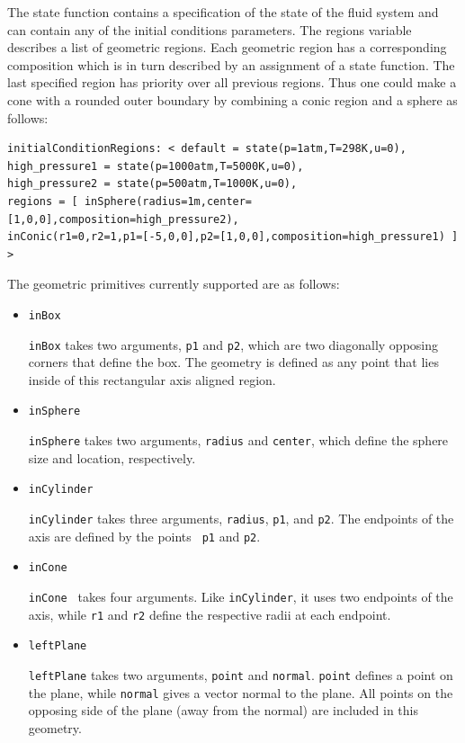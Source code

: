 \documentclass{article}
\begin{document}
\begin{enumerate}
The state function contains a specification of the state of the fluid
system and can contain any of the initial conditions parameters.
The regions variable describes a list of
geometric regions.  Each geometric region has a corresponding
composition which is in turn described by an assignment of a state
function.  The last specified region has priority over all previous regions.
Thus one could make a cone with a rounded outer boundary by combining
a conic region and a sphere as follows:

\begin{verbatim}
initialConditionRegions: < default = state(p=1atm,T=298K,u=0),
high_pressure1 = state(p=1000atm,T=5000K,u=0),
high_pressure2 = state(p=500atm,T=1000K,u=0),
regions = [ inSphere(radius=1m,center=[1,0,0],composition=high_pressure2),
inConic(r1=0,r2=1,p1=[-5,0,0],p2=[1,0,0],composition=high_pressure1) ]
>
\end{verbatim}

The geometric primitives currently supported are as follows:

\begin{itemize}
\item {\tt inBox}

{\tt inBox} takes two arguments, {\tt p1} and {\tt p2}, which are two
diagonally opposing corners that define the box.  The geometry is
defined as any point that lies inside of this rectangular axis aligned region.

\item {\tt inSphere}

{\tt inSphere} takes two arguments, {\tt radius} and {\tt center},
which define the sphere size and location, respectively.

\item {\tt inCylinder}

{\tt inCylinder} takes three arguments, {\tt radius}, {\tt p1}, and
{\tt p2}.  The endpoints of the axis are defined by the points {\tt
  p1} and {\tt p2}.

\item {\tt inCone}

{\tt inCone } takes four arguments.  Like {\tt inCylinder}, it uses
two endpoints of the axis, while {\tt r1} and {\tt r2} define the
respective radii at each endpoint.

\item {\tt leftPlane}

{\tt leftPlane} takes two arguments, {\tt point} and {\tt normal}.
{\tt point} defines a point on the plane, while {\tt normal} gives a
vector normal to the plane.  All points on the opposing side of the
plane (away from the normal) are included in this geometry.


\end{itemize}
\end{enumerate}
\end{document}
